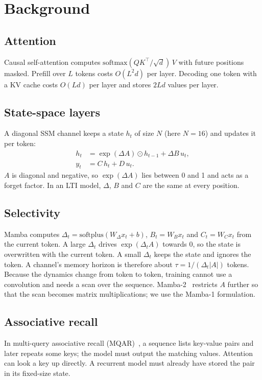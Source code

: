 \documentclass[conference]{IEEEtran}
\begin{document}
\section{Background}

\subsection{Attention}
Causal self-attention computes $\mathrm{softmax}(QK^\top/\sqrt{d})\,V$ with future positions masked.
Prefill over $L$ tokens costs $O(L^2 d)$ per layer. Decoding one token with a KV cache costs $O(Ld)$
per layer and stores $2Ld$ values per layer.

\subsection{State-space layers}
A diagonal SSM channel keeps a state $h_t$ of size $N$ (here $N = 16$) and updates it per token:
\begin{align}
  h_t &= \exp(\Delta A) \odot h_{t-1} + \Delta B\, u_t, \label{eq:ssm}\\
  y_t &= C\, h_t + D\, u_t .
\end{align}
$A$ is diagonal and negative, so $\exp(\Delta A)$ lies between 0 and 1 and acts as a forget factor. In
an LTI model, $\Delta$, $B$ and $C$ are the same at every position.

\subsection{Selectivity}
Mamba computes $\Delta_t = \mathrm{softplus}(W_\Delta x_t + b)$, $B_t = W_B x_t$ and $C_t = W_C x_t$ from
the current token. A large $\Delta_t$ drives $\exp(\Delta_t A)$ towards 0, so the state is overwritten
with the current token. A small $\Delta_t$ keeps the state and ignores the token. A channel's memory
horizon is therefore about $\tau = 1/(\Delta_t |A|)$ tokens. Because the dynamics change from token to
token, training cannot use a convolution and needs a scan over the sequence. Mamba-2~\cite{dao2024mamba2}
restricts $A$ further so that the scan becomes matrix multiplications; we use the Mamba-1 formulation.

\subsection{Associative recall}
In multi-query associative recall (MQAR)~\cite{arora2023zoology}, a sequence lists key-value pairs and
later repeats some keys; the model must output the matching values. Attention can look a key up
directly. A recurrent model must already have stored the pair in its fixed-size state.
\end{document}
